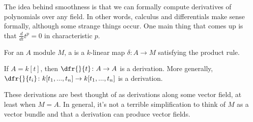 The idea behind smoothness is that we can formally compute derivatives of polynomials over any field. In other words, calculus and differentials make sense formally, although some strange things occur. One main thing that comes up is that $\frac{d}{dt}t^p = 0$ in characteristic $p$. 

\begin{defn}
For an $A$ module $M$, a  is a $k$-linear map $\delta\colon A \to M$ satisfying the product rule.
\end{defn}

\begin{exm}
If $A = k[t]$, then $\dfr{}{t}\colon A \to A$ is a derivation. More generally, $\dfr{}{t_i}\colon  k[t_1, ... , t_n] \to k[t_1, ... , t_n]$ is a derivation.
\end{exm}

These derivations are best thought of as derivations along some vector field, at least when $M = A$. In general, it's not a terrible simplification to think of $M$ as a vector bundle and that a derivation can produce vector fields. 

